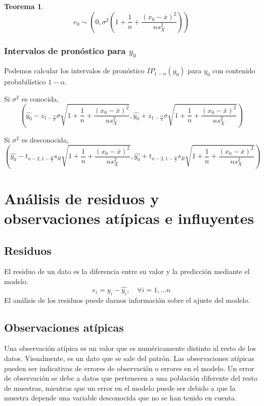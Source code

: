 \documentclass{report}
\newtheorem{theorem}{Teorema}[chapter]
\theoremstyle{remark}
\theoremstyle{remark}
\theoremstyle{remark}
\theoremstyle{definition}
\theoremstyle{definition}
\theoremstyle{definition}
\begin{document}
\begin{theorem}
    $$e_0 \sim \left( 0, \sigma^2 \left(1+\frac{1}{n}+\frac{(x_0-\bar{x})^2}{ns_X^2} \right) \right)$$
\end{theorem}

\subsubsection*{Intervalos de pronóstico para $y_0$}
Podemos calcular los intervalos de pronóstico $IP_{1-\alpha}(y_0)$ para $y_0$ con contenido probabilístico $1-\alpha$.

Si $\sigma^2$ es conocida,
$$\left( \hat{y_0} - z_{1-\frac{\alpha}{2}} \sigma \sqrt{1 + \frac{1}{n} + \frac{(x_0-\bar{x})^2}{ns_X^2}}, \hat{y_0} + z_{1-\frac{\alpha}{2}} \sigma \sqrt{1 + \frac{1}{n} + \frac{(x_0-\bar{x})^2}{ns_X^2}} \right)$$

Si $\sigma^2$ es desconocida,
$$\left( \hat{y_0} - t_{n-2, 1-\frac{\alpha}{2}} s_R \sqrt{1 + \frac{1}{n} + \frac{(x_0-\bar{x})^2}{ns_X^2}}, \hat{y_0} + t_{n-2, 1-\frac{\alpha}{2}} s_R \sqrt{1 + \frac{1}{n} + \frac{(x_0-\bar{x})^2}{ns_X^2}} \right)$$

\section{Análisis de residuos y observaciones atípicas e influyentes}
\subsection*{Residuos}
El residuo de un dato es la diferencia entre su valor y la predicción mediante el modelo.
$$e_i = y_i - \hat{y_i}, \quad \forall i = 1, \dots n$$
El análisis de los residuos puede darnos información sobre el ajuste del modelo.

\subsection*{Observaciones atípicas}
Una observación atípica es un valor que es numéricamente distinto al resto de los datos.
Visualmente, es un dato que se sale del patrón.
Las observaciones atípicas pueden ser indicativas de errores de observación o errores en el modelo.
Un error de observación se debe a datos que pertenecen a una población diferente del resto de muestras, mientras que un error en el modelo puede ser debido a que la muestra depende una variable desconocida que no se han tenido en cuenta.
\end{document}
